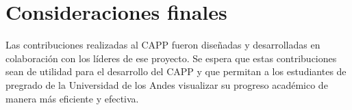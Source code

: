 \section{Consideraciones finales}

Las contribuciones realizadas al \gls{CAPP} fueron diseñadas y desarrolladas en colaboración con los líderes de ese proyecto. Se espera que estas contribuciones sean de utilidad para el desarrollo del \gls{CAPP} y que permitan a los estudiantes de pregrado de la Universidad de los Andes visualizar su progreso académico de manera más eficiente y efectiva.
